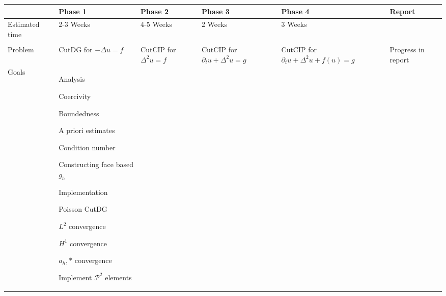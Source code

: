 \documentclass[landscape,a4paper]{article}
\newcommand{\cmark}{\ding{51}}%
\newcommand{\done}{\rlap{$\square$}{\raisebox{2pt}{\footnotesize \hspace{1pt}\cmark}}%
\hspace{-2.5pt}}
\begin{document}
\begin{table}[htpb]
    \centering
    \footnotesize
    \begin{tabular}{|p{}|p{}|p{}|p{}|p{}|p{}|}
    \hline & \textbf{ Phase 1}       & \textbf{Phase 2} & \textbf{Phase 3}& \textbf{Phase 4} & \textbf{Report}  \\
    \hline Estimated time & 2-3 Weeks & 4-5 Weeks & 2 Weeks & 3 Weeks &  \\
    \hline &&&&& \\[-1em] %
         Problem & CutDG for $ -\Delta u = f  $
                        & CutCIP for $\Delta ^2 u = f$
                        & CutCIP for $\partial _{t} u + \Delta ^2 u =g $
                        & CutCIP for  $\partial _{t} u + \Delta ^2 u + f(u) = g $
                        & Progress in report  \\
        \hline Goals

        &
        \begin{itemize}[leftmargin=3mm,noitemsep]
            \item Analysis \begin{todolist}[noitemsep]
                \item[\done] Coercivity
                \item[\done] Boundedness
                \item[\done] A priori estimates
                \item[\done] Condition number
                \item[\done] Constructing face based $g_{h}$
                \end{todolist}
            \item Implementation
                \begin{todolist}[noitemsep]

                \item[\done] Poisson CutDG
                    \begin{todolist}[noitemsep]
                        \item[\done] $L^{2}$ convergence
                        \item[\done] $H^{1}$ convergence
                        \item[\done] $a_{h},*$ convergence
                        \item[\done] Implement $\mathcal{P} ^{2}$ elements
                    \end{todolist}
                \end{todolist}
        \end{itemize}


\end{tabular}
\end{table}
\end{document}
